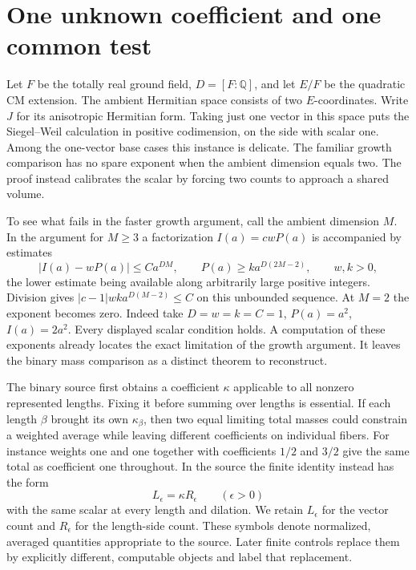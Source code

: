 \documentclass[12pt,letterpaper]{article}
\begin{document}
\section{One unknown coefficient and one common test}

Let $F$ be the totally real ground field, $D=[F:\mathbb Q]$, and let $E/F$ be the quadratic CM extension. The ambient Hermitian space consists of two $E$-coordinates. Write $J$ for its anisotropic Hermitian form. Taking just one vector in this space puts the Siegel--Weil calculation in positive codimension, on the side with scalar one. Among the one-vector base cases this instance is delicate. The familiar growth comparison has no spare exponent when the ambient dimension equals two. The proof instead calibrates the scalar by forcing two counts to approach a shared volume.

To see what fails in the faster growth argument, call the ambient dimension $M$. In the argument for $M\geq 3$ a factorization $I(a)=c w P(a)$ is accompanied by estimates
\[
 |I(a)-wP(a)|\leq C a^{DM},\qquad
 P(a)\geq k a^{D(2M-2)},\qquad w,k>0,
\]
the lower estimate being available along arbitrarily large positive integers. Division gives $|c-1|wk a^{D(M-2)}\leq C$ on this unbounded sequence. At $M=2$ the exponent becomes zero. Indeed take $D=w=k=C=1$, $P(a)=a^2$, $I(a)=2a^2$. Every displayed scalar condition holds. A computation of these exponents already locates the exact limitation of the growth argument. It leaves the binary mass comparison as a distinct theorem to reconstruct.

The binary source first obtains a coefficient $\kappa$ applicable to all nonzero represented lengths. Fixing it before summing over lengths is essential. If each length $\beta$ brought its own $\kappa_\beta$, then two equal limiting total masses could constrain a weighted average while leaving different coefficients on individual fibers. For instance weights one and one together with coefficients $1/2$ and $3/2$ give the same total as coefficient one throughout. In the source the finite identity instead has the form
\[
 L_\epsilon=\kappa R_\epsilon\qquad (\epsilon>0)
\]
with the same scalar at every length and dilation. We retain $L_\epsilon$ for the vector count and $R_\epsilon$ for the length-side count. These symbols denote normalized, averaged quantities appropriate to the source. Later finite controls replace them by explicitly different, computable objects and label that replacement.
\end{document}
